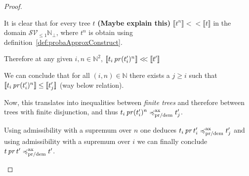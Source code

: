 \begin{proof}
\begin{itemize}
\begin{description}
    It is clear that for every tree $t$
    \textbf{(Maybe explain this)} $\llbracket t^n \rrbracket <\!\!< \llbracket t \rrbracket$ 
    in the domain $\mathcal{S}\mathcal{V}_{\leq 1} \mathbb{N}_\bot$, 
    where $t^n$ is obtain using definition~\ref{def:probaApproxConstruct}.

    Therefore at any given $i,n \in \mathbb{N}^2$, 
    $\llbracket t_i \operatorname{\mathit{pr}} (t_i')^n \rrbracket <\!\!< \llbracket t' \rrbracket$

    We can conclude that for all $(i,n) \in \mathbb{N}$ there exists a 
    $j \geq i$ such that $\llbracket t_i \operatorname{\mathit{pr}} (t_i')^n \rrbracket \leq
    \llbracket t_j' \rrbracket$ (way below relation).

    Now, this translates into inequalities between \emph{finite trees}
    and therefore between trees with finite disjunction, and thus 
    $ t_i \operatorname{\mathit{pr}} (t_i')^n \preccurlyeq^{\text{ax}}_{\text{pr/dem}} t_j'$.

    Using admissibility with a supremum over $n$ 
    one deduces $t_i \operatorname{\mathit{pr}} t_i' \preccurlyeq^{\text{ax}}_{\text{pr/dem}} t_j'$
    and using admissibility with a supremum over $i$ we can finally conclude
    $t \operatorname{\mathit{pr}} t' \preccurlyeq^{\text{ax}}_{\text{pr/dem}} t'$.
    \end{description}
    \end{itemize}
    

\end{proof}

